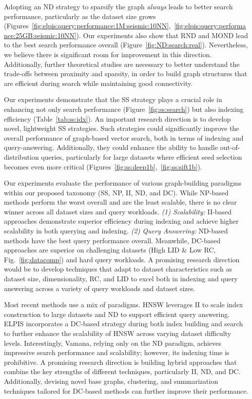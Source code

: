  Adopting an ND strategy to sparsify the graph \textit{always} leads to better search performance, particularly as the dataset size grows (Figures~\ref{fig:elpis:query:performance:1M:seismic:10NN},~\ref{fig:elpis:query:performance:25GB:seismic:10NN}). Our experiments also show that RND and MOND lead to the best search performance overall (Figure~\ref{fig:ND:search:real}). Nevertheless, we believe there is significant room for improvement in this direction. Additionally, further theoretical studies are necessary to better understand the trade-offs between proximity and sparsity, in order to build graph structures that are efficient during search while maintaining good connectivity.

 Our experiments demonstrate that the SS strategy plays a crucial role in enhancing not only search performance (Figure~\ref{fig:ss:search}) but also indexing efficiency (Table~\ref{tab:ss:idx}). An important research direction is to develop novel, lightweight SS strategies. Such strategies could significantly improve the overall performance of graph-based vector search, both in terms of indexing and query-answering. Additionally, they could enhance the ability to handle out-of-distribution queries, particularly for large datasets where efficient seed selection becomes even more critical (Figures~\ref{fig:ss:deep1b},~\ref{fig:ss:sift1b}).

 Our experiments evaluate the performance of various graph-building paradigms within our proposed taxonomy (SS, NP, II, ND, and DC). While NP-based methods perform the worst overall and are the least scalable, there is no clear winner across all dataset sizes and query workloads. \textit{(1) Scalability:} II-based approaches demonstrate superior efficiency during indexing and achieve higher scalability in both querying and indexing. \textit{(2) Query Answering:} ND-based methods have the best query performance overall. Meanwhile, DC-based approaches are superior on challenging datasets (High LID \& Low RC, Fig.~\ref{fig:datacomp}) and hard query workloads. A promising research direction would be to develop techniques that adapt to dataset characteristics such as dataset size, dimensionality, RC, and LID to excel both in indexing and query answering across a variety of query workloads and dataset sizes.

 Most recent methods use a mix of paradigms. HNSW leverages II to scale index construction to large datasets and ND to support efficient query answering. ELPIS incorporates a DC-based strategy during both index building and search to further enhance the scalability of HNSW across varying dataset difficulty levels. Interestingly, Vamana, relying only on the ND paradigm, achieves impressive search performance and scalability; however, its indexing time is prohibitive. A promising research direction is building hybrid approaches that combine the key strengths of different techniques, particularly II, ND, and DC. Additionally, devising novel base graphs, clustering, and summarization techniques tailored for DC-based methods can further improve their performance.

